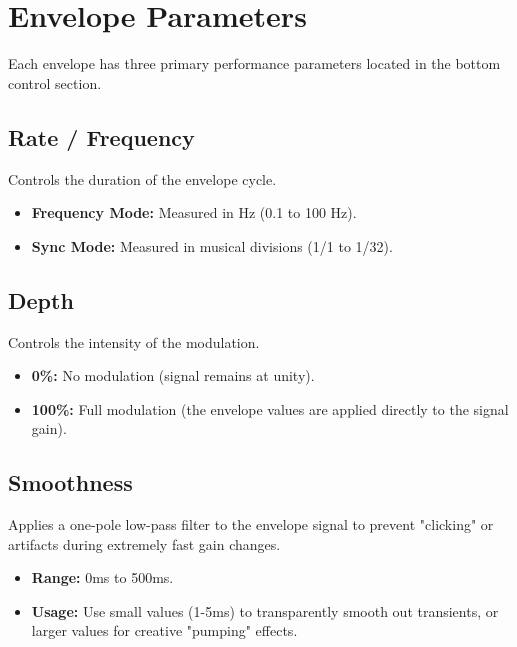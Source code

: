 \chapter{Envelope Parameters}
\label{ch:envelope_parameters}

Each envelope has three primary performance parameters located in the bottom control section.

\section{Rate / Frequency}
Controls the duration of the envelope cycle.
\begin{itemize}
    \item \textbf{Frequency Mode:} Measured in Hz (0.1 to 100 Hz).
    \item \textbf{Sync Mode:} Measured in musical divisions (1/1 to 1/32).
\end{itemize}

\section{Depth}
Controls the intensity of the modulation.
\begin{itemize}
    \item \textbf{0\%:} No modulation (signal remains at unity).
    \item \textbf{100\%:} Full modulation (the envelope values are applied directly to the signal gain).
\end{itemize}

\section{Smoothness}
Applies a one-pole low-pass filter to the envelope signal to prevent "clicking" or artifacts during extremely fast gain changes.
\begin{itemize}
    \item \textbf{Range:} 0ms to 500ms.
    \item \textbf{Usage:} Use small values (1-5ms) to transparently smooth out transients, or larger values for creative "pumping" effects.
\end{itemize}
